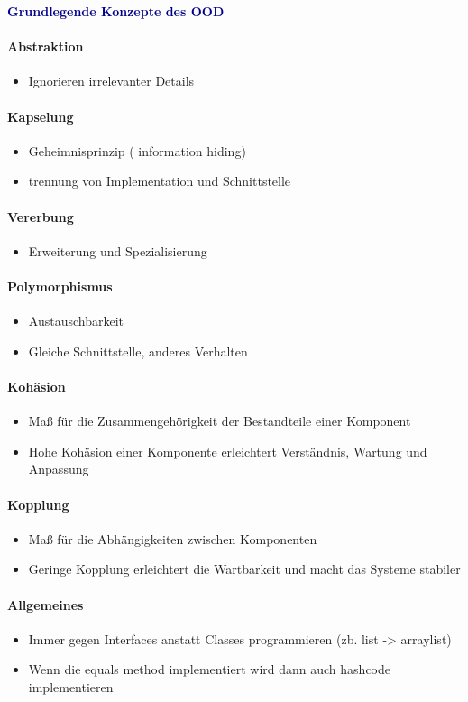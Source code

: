 \textbf{\textcolor{darkblue}{Grundlegende Konzepte des OOD}}~
\paragraph{Abstraktion}
\begin{itemize}
	\item Ignorieren irrelevanter Details
\end{itemize}

\paragraph{Kapselung}
\begin{itemize}
	\item Geheimnisprinzip ( information hiding)
	\item trennung von Implementation und Schnittstelle
\end{itemize}

\paragraph{Vererbung}
\begin{itemize}
	\item Erweiterung und Spezialisierung
\end{itemize}

\paragraph{Polymorphismus}
\begin{itemize}
	\item Austauschbarkeit
	\item Gleiche Schnittstelle, anderes Verhalten
\end{itemize}

\paragraph{Kohäsion}
\begin{itemize}
	\item Maß für die Zusammengehörigkeit der Bestandteile einer Komponent
	\item Hohe Kohäsion einer Komponente erleichtert Verständnis, Wartung und Anpassung
\end{itemize}

\paragraph{Kopplung}
\begin{itemize}
	\item Maß für die Abhängigkeiten zwischen Komponenten
	\item Geringe Kopplung erleichtert die Wartbarkeit und macht das Systeme stabiler
\end{itemize}

\paragraph{Allgemeines}  \begin{itemize} 
 \item   Immer  gegen  Interfaces anstatt  Classes programmieren  (zb.  list ->  arraylist)  
\item Wenn  die equals  method  implementiert  wird   dann  auch  hashcode  implementieren
\end{itemize}
